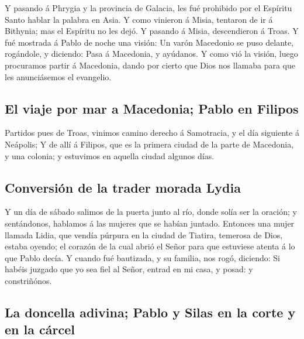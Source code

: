  Y pasando á Phrygia y la provincia de Galacia, les fué
prohibido por el Espíritu Santo hablar la palabra en Asia. 
Y como vinieron á Misia, tentaron de ir á Bithynia; mas el Espíritu no
les dejó.  Y pasando á Misia, descendieron á Troas.
 Y fué mostrada á Pablo de noche una visión: Un varón
Macedonio se puso delante, rogándole, y diciendo: Pasa á Macedonia, y
ayúdanos.  Y como vió la visión, luego procuramos partir á
Macedonia, dando por cierto que Dios nos llamaba para que les
anunciásemos el evangelio.

\hypertarget{el-viaje-por-mar-a-macedonia-pablo-en-filipos}{%
\subsection{El viaje por mar a Macedonia; Pablo en
Filipos}\label{el-viaje-por-mar-a-macedonia-pablo-en-filipos}}

 Partidos pues de Troas, vinimos camino derecho á
Samotracia, y el día siguiente á Neápolis;  Y de allí á
Filipos, que es la primera ciudad de la parte de Macedonia, y una
colonia; y estuvimos en aquella ciudad algunos días.

\hypertarget{conversiuxf3n-de-la-trader-morada-lydia}{%
\subsection{Conversión de la trader morada
Lydia}\label{conversiuxf3n-de-la-trader-morada-lydia}}

 Y un día de sábado salimos de la puerta junto al río,
donde solía ser la oración; y sentándonos, hablamos á las mujeres que se
habían juntado.  Entonces una mujer llamada Lidia, que
vendía púrpura en la ciudad de Tiatira, temerosa de Dios, estaba oyendo;
el corazón de la cual abrió el Señor para que estuviese atenta á lo que
Pablo decía.  Y cuando fué bautizada, y su familia, nos
rogó, diciendo: Si habéis juzgado que yo sea fiel al Señor, entrad en mi
casa, y posad: y constriñónos.

\hypertarget{la-doncella-adivina-pablo-y-silas-en-la-corte-y-en-la-cuxe1rcel}{%
\subsection{La doncella adivina; Pablo y Silas en la corte y en la
cárcel}\label{la-doncella-adivina-pablo-y-silas-en-la-corte-y-en-la-cuxe1rcel}}

